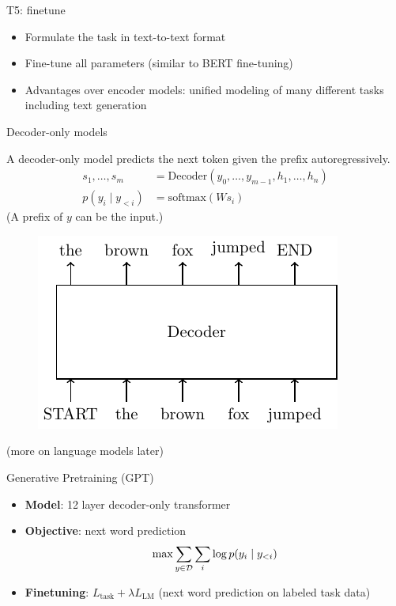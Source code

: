 \documentclass[usenames,dvipsnames,notes,11pt,aspectratio=169,hyperref={colorlinks=true, linkcolor=blue}]{beamer}
\begin{document}
\begin{frame}
    {T5: finetune}
    \begin{itemize}
        \item Formulate the task in text-to-text format
        \item Fine-tune all parameters (similar to BERT fine-tuning)
        \item Advantages over encoder models: unified modeling of many different tasks including text generation
    \end{itemize}
\end{frame}

\begin{frame}
    {Decoder-only models}

    A decoder-only model predicts the next token given the prefix autoregressively.
    \begin{align*}
        s_1,\ldots,s_m &= \mathrm{Decoder}(y_0,\ldots,y_{m-1}, h_1,\ldots,h_n)\\
        p(y_i\mid y_{<i}) &= \mathrm{softmax}(Ws_i)
    \end{align*}
    (A prefix of $y$ can be the input.)
    \begin{figure}
            \includegraphics[height=0.5\textheight]{figures/decoder}
    \end{figure}
    (more on language models later)
\end{frame}

\begin{frame}
    {Generative Pretraining (GPT)}
    \begin{itemize}
        \item {\bf Model}: 12 layer decoder-only transformer
        \item {\bf Objective}: next word prediction
            $$
            \max \sum_{y\in\mathcal{D}} \sum_i \log p(y_i\mid y_{<i})
            $$
        \item {\bf Finetuning}:  $L_{\text{task}} + \lambda L_{\text{LM}}$ (next word prediction on labeled task data)
    \end{itemize}
\end{frame}
\end{document}
